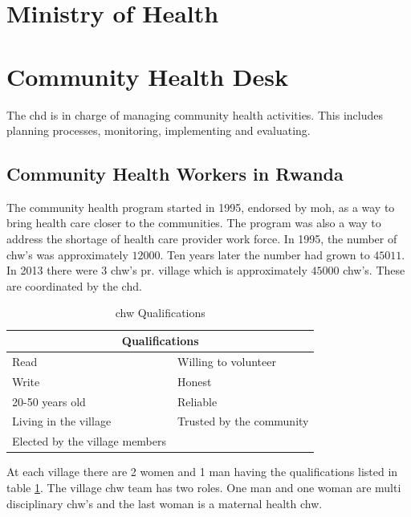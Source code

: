\section{Ministry of Health}


\section{Community Health Desk}
The \gls{chd} is in charge of managing community health activities. This includes planning processes, monitoring, implementing and evaluating.

\cite{chd:strategy}


\subsection{Community Health Workers in Rwanda}
The community health program started in 1995, endorsed by \gls{moh}, as a way to bring health care closer to the communities. The program was also a way to address the shortage of health care provider work force. In 1995, the number of \gls{chw}'s was approximately $12000$. Ten years later the number had grown to $45011$. In 2013 there were 3 \gls{chw}'s pr. village which is approximately $45000$ \gls{chw}'s. These are coordinated by the \gls{chd}. 

\begin{table}
\centering
\begin{tabular}{|l l|}
\hline
\multicolumn{2}{|c|}{\textbf{Qualifications}} \\
\hline
Read & Willing to volunteer \\
Write & Honest \\
20-50 years old & Reliable \\
Living in the village & Trusted by the community \\
Elected by the village members & \\
\hline
\end{tabular}
\caption{\gls{chw} Qualifications}
\label{table:chdqualifications}
\end{table}

At each village there are 2 women and 1 man having the qualifications listed in table \ref{table:chdqualifications}. The village \gls{chw} team has two roles. One man and one woman are multi disciplinary \gls{chw}'s and the last woman is a maternal health \gls{chw}.


